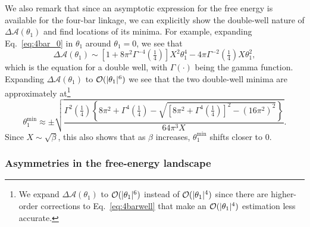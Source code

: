 We also remark that since an asymptotic expression for the free energy is available for the four-bar linkage, we can explicitly show the double-well nature of $\Delta\mathscr{A}(\theta_{1})$ and find locations of its minima.
For example, expanding Eq.~\eqref{eq:4bar_0} in $\theta_{1}$ around $\theta_{1} = 0$, we see that
%
\begin{equation}
  \Delta\mathscr{A}(\theta_{1}) \sim \left[1 + 8\pi^{2}\Gamma^{-4}\left(\tfrac{1}{4}\right)\right]X^{2}\theta_{1}^{4} - 4\pi\Gamma^{-2}\left(\tfrac{1}{4}\right)X\theta_{1}^{2},\label{eq:4barwell}
\end{equation}
%
which is the equation for a double well, with $\Gamma(\cdot)$ being the gamma function.
Expanding $\Delta\mathscr{A}(\theta_{1})$ to $\mathcal{O}(\lvert\theta_{1}\rvert^{6})$ we see that the two double-well minima are approximately at\footnote{We expand $\Delta\mathscr{A}(\theta_{1})$ to $\mathcal{O}(\lvert\theta_{1}\rvert^{6})$ instead of $\mathcal{O}(\lvert\theta_{1}\rvert^{4})$ since there are higher-order corrections to Eq.~\eqref{eq:4barwell} that make an $\mathcal{O}(\lvert\theta_{1}\rvert^{4})$ estimation less accurate.}
%
\begin{equation}
  \theta_{1}^{\text{min}} \approx \pm \sqrt{\frac{\Gamma^{2}\left(\frac{1}{4}\right)\left\{8\pi^{2} + \Gamma^{4}\left(\frac{1}{4}\right) - \sqrt{\left[8\pi^{2} + \Gamma^{4}\left(\frac{1}{4}\right)\right]^{2} - (16\pi^{2})^{2}}\right\}}{64\pi^{3}X}}.
  \label{eq:thetamin}
\end{equation}
%
Since $X \sim \sqrt{\beta}$, this also shows that as $\beta$ increases, $\theta_{1}^{\text{min}}$ shifts closer to $0$.

\subsubsection*{Asymmetries in the free-energy landscape}

